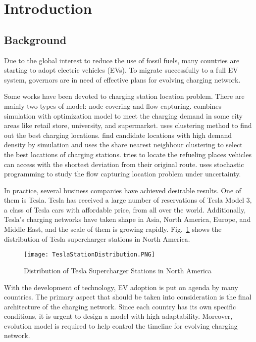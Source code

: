 \documentclass{mcmthesis}
\begin{document}
\tableofcontents

\newpage

\section{Introduction}
\subsection{Background}\label{Sec-Background}
Due to the global interest to reduce the use of fossil fuels, many countries are starting to adopt electric vehicles (EVs). To migrate successfully to a full EV system, governors are in need of effective plans for evolving charging network.

Some works have been devoted to charging station location problem. There are mainly two types of model: node-covering and flow-capturing. \cite{Xi2013} combines simulation with optimization model to meet the charging demand in some city areas like retail store, university, and supermarket. \cite{Shi2014} uses clustering method to find out the best charging locations. \cite{Dong2016} find candidate locations with high demand density by simulation and uses the share nearest neighbour clustering to select the best locations of charging stations. \cite{Kim2012} tries to locate the refueling places vehicles can access with the shortest deviation from their original route. \cite{Wu2017} uses stochastic programming to study the flow capturing location problem under uncertainty.

In practice, several business companies have achieved desirable results. One of them is Tesla. Tesla has received a large number of reservations of Tesla Model 3, a class of Tesla cars with affordable price, from all over the world. Additionally, Tesla's charging networks have taken shape in Asia, North America, Europe, and Middle East, and the scale of them is growing rapidly. Fig.~\ref{Fig-TeslaStationDistribution} shows the distribution of Tesla supercharger stations in North America.

\begin{figure}[htbp]
  \centering
  \texttt{[image: TeslaStationDistribution.PNG]}
  \caption{Distribution of Tesla Supercharger Stations in North America~\cite{Supercharging}}\label{Fig-TeslaStationDistribution}
\end{figure}

With the development of technology, EV adoption is put on agenda by many countries. The primary aspect that should be taken into consideration is the final architecture of the charging network. Since each country has its own specific conditions, it is urgent to design a model with high adaptability. Moreover, evolution model is required to help control the timeline for evolving charging network.
\end{document}
